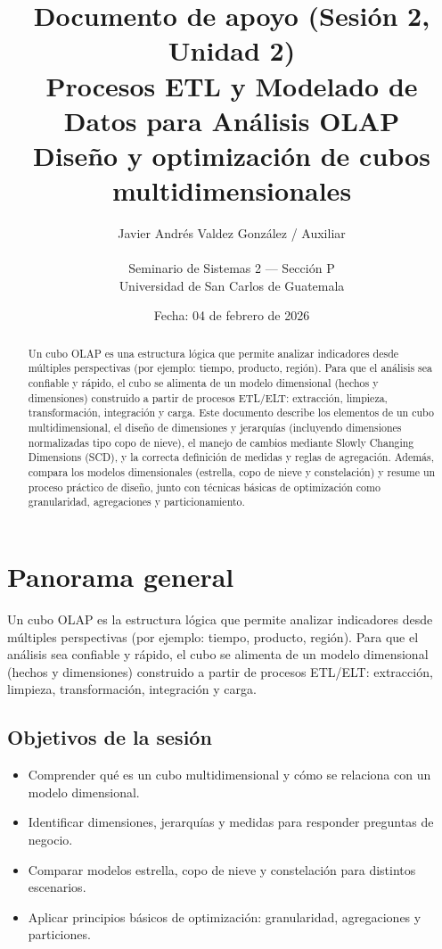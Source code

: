 \documentclass[12pt]{article}
\title{\textbf{Documento de apoyo (Sesión 2, Unidad 2)}\\
\large Procesos ETL y Modelado de Datos para Análisis OLAP\\
\normalsize Diseño y optimización de cubos multidimensionales}
\author{Javier Andrés Valdez González / Auxiliar \\\\
\small Seminario de Sistemas 2 — Sección P \\
\small Universidad de San Carlos de Guatemala}
\date{Fecha: 04 de febrero de 2026}
\begin{document}
\maketitle

\begin{abstract}
Un cubo OLAP es una estructura lógica que permite analizar indicadores desde múltiples perspectivas (por ejemplo: tiempo, producto, región). Para que el análisis sea confiable y rápido, el cubo se alimenta de un modelo dimensional (hechos y dimensiones) construido a partir de procesos ETL/ELT: extracción, limpieza, transformación, integración y carga. Este documento describe los elementos de un cubo multidimensional, el diseño de dimensiones y jerarquías (incluyendo dimensiones normalizadas tipo copo de nieve), el manejo de cambios mediante Slowly Changing Dimensions (SCD), y la correcta definición de medidas y reglas de agregación. Además, compara los modelos dimensionales (estrella, copo de nieve y constelación) y resume un proceso práctico de diseño, junto con técnicas básicas de optimización como granularidad, agregaciones y particionamiento.
\end{abstract}

\section{Panorama general}
Un cubo OLAP es la estructura lógica que permite analizar indicadores desde múltiples perspectivas (por ejemplo: tiempo, producto, región). Para que el análisis sea confiable y rápido, el cubo se alimenta de un modelo dimensional (hechos y dimensiones) construido a partir de procesos ETL/ELT: extracción, limpieza, transformación, integración y carga.

\subsection*{Objetivos de la sesión}
\begin{itemize}[leftmargin=*, itemsep=0.25em]
  \item Comprender qué es un cubo multidimensional y cómo se relaciona con un modelo dimensional.
  \item Identificar dimensiones, jerarquías y medidas para responder preguntas de negocio.
  \item Comparar modelos estrella, copo de nieve y constelación para distintos escenarios.
  \item Aplicar principios básicos de optimización: granularidad, agregaciones y particiones.
\end{itemize}
\end{document}
